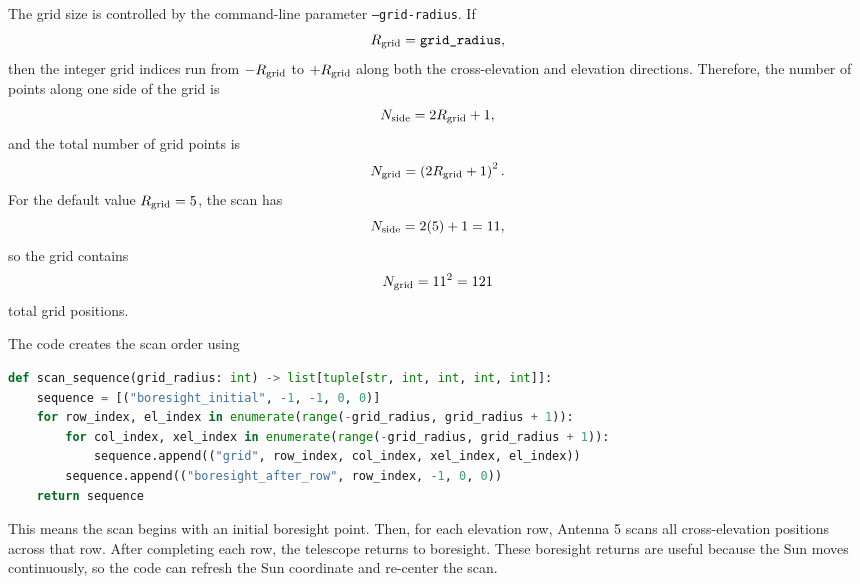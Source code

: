 \documentclass[12pt]{extarticle}
\begin{document}
The grid size is controlled by the command-line parameter \texttt{--grid-radius}. If
\begin{equation}
    R_{\rm grid}=\texttt{grid\_radius},
\end{equation}
then the integer grid indices run from $-R_{\rm grid}$ to $+R_{\rm grid}$ along both the cross-elevation and elevation directions. Therefore, the number of points along one side of the grid is
\begin{equation}
    N_{\rm side}=2R_{\rm grid}+1,
\end{equation}
and the total number of grid points is
\begin{equation}
    N_{\rm grid}=\left(2R_{\rm grid}+1\right)^2.
\end{equation}
For the default value $R_{\rm grid}=5$, the scan has
\begin{equation}
    N_{\rm side}=2(5)+1=11,
\end{equation}
so the grid contains
\begin{equation}
    N_{\rm grid}=11^2=121
\end{equation}
total grid positions.

The code creates the scan order using
\begin{lstlisting}[language=Python]
def scan_sequence(grid_radius: int) -> list[tuple[str, int, int, int, int]]:
    sequence = [("boresight_initial", -1, -1, 0, 0)]
    for row_index, el_index in enumerate(range(-grid_radius, grid_radius + 1)):
        for col_index, xel_index in enumerate(range(-grid_radius, grid_radius + 1)):
            sequence.append(("grid", row_index, col_index, xel_index, el_index))
        sequence.append(("boresight_after_row", row_index, -1, 0, 0))
    return sequence
\end{lstlisting}
This means the scan begins with an initial boresight point. Then, for each elevation row, Antenna 5 scans all cross-elevation positions across that row. After completing each row, the telescope returns to boresight. These boresight returns are useful because the Sun moves continuously, so the code can refresh the Sun coordinate and re-center the scan.
\end{document}
